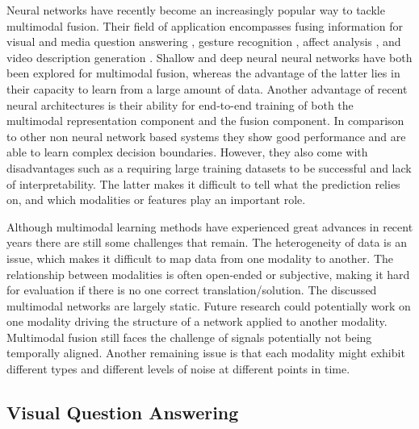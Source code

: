 \documentclass{article}
\begin{document}
Neural networks have recently become an increasingly popular way to tackle multimodal fusion. Their field of application encompasses fusing information for visual and media question answering \citep{gao2015are, malinowski2015ask, xu2016ask}, gesture recognition \citep{neverova2016moddrop}, affect analysis \citep{kahou2015EmoNets,nojavanasghari2016deep}, and video description generation \citep{jin2016video, venugopalan2016improving}. Shallow \citep{gao2015are} and deep \citep{nojavanasghari2016deep, venugopalan2016improving} neural neural networks have both been explored for multimodal fusion, whereas the advantage of the latter lies in their capacity to learn from a large amount of data. Another advantage of recent neural architectures is their ability for end-to-end training of both the multimodal representation component and the fusion component. In comparison to other non neural network based systems they show good performance and are able to learn complex decision boundaries. However, they also come with disadvantages such as a requiring large training datasets to be successful and lack of interpretability. The latter makes it difficult to tell what the prediction relies on, and which modalities or features play an important role.

Although multimodal learning methods have experienced great advances in recent years there are still some challenges that remain. The heterogeneity of data is an issue, which makes it difficult to map data from one modality to another. The relationship between modalities is often open-ended or subjective, making it hard for evaluation if there is no one correct translation/solution. The discussed multimodal networks are largely static. Future research could potentially work on one modality driving the structure of a network applied to another modality. Multimodal fusion still faces the challenge of signals potentially not being temporally aligned. Another remaining issue is that each modality might exhibit different types and different levels of noise at different points in time.

\subsection{Visual Question Answering} \label{vqa}
\end{document}
